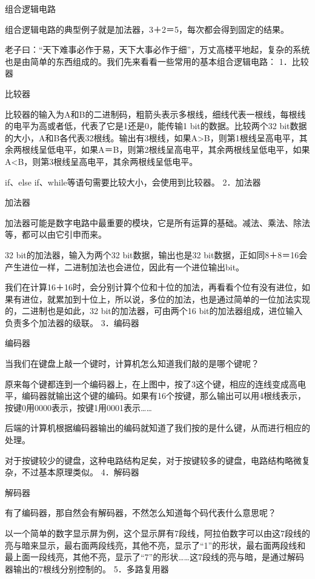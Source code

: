 \documentclass[12pt,UTF8]{ctexbook}
\begin{document}
组合逻辑电路

组合逻辑电路的典型例子就是加法器，3＋2＝5，每次都会得到固定的结果。

老子曰：“天下难事必作于易，天下大事必作于细”，万丈高楼平地起，复杂的系统也是由简单的东西组成的。我们先来看看一些常用的基本组合逻辑电路：
1．比较器

比较器

比较器的输入为A和B的二进制码，粗箭头表示多根线，细线代表一根线，每根线的电平为高或者低，代表了它是1还是0，能传输1 bit的数据。比较两个32 bit数据的大小，A和B各代表32根线。输出有3根线，如果A>B，则第1根线呈高电平，其余两根线呈低电平，如果A＝B，则第2根线呈高电平，其余两根线呈低电平，如果A<B，则第3根线呈高电平，其余两根线呈低电平。

if、else if、while等语句需要比较大小，会使用到比较器。
2．加法器

加法器

加法器可能是数字电路中最重要的模块，它是所有运算的基础。减法、乘法、除法等，都可以由它引申而来。

32 bit的加法器，输入为两个32 bit数据，输出也是32 bit数据，正如同8＋8＝16会产生进位一样，二进制加法也会进位，因此有一个进位输出bit。

我们在计算16＋16时，会分别计算个位和十位的加法，再看看个位有没有进位，如果有进位，就累加到十位上，所以说，多位的加法，也是通过简单的一位加法实现的，二进制也是如此，32 bit的加法器，可由两个16 bit的加法器组成，进位输入负责多个加法器的级联。
3．编码器

编码器

当我们在键盘上敲一个键时，计算机怎么知道我们敲的是哪个键呢？

原来每个键都连到一个编码器上，在上图中，按了3这个键，相应的连线变成高电平，编码器就输出这个键的编码。如果有16个按键，那么输出可以用4根线表示，按键0用0000表示，按键1用0001表示……

后端的计算机根据编码器输出的编码就知道了我们按的是什么键，从而进行相应的处理。

对于按键较少的键盘，这种电路结构足矣，对于按键较多的键盘，电路结构略微复杂，不过基本原理类似。
4．解码器

解码器

有了编码器，那自然会有解码器，不然怎么知道每个码代表什么意思呢？

以一个简单的数字显示屏为例，这个显示屏有7段线，阿拉伯数字可以由这7段线的亮与暗来显示，最右面两段线亮，其他不亮，显示了“1”的形状，最右面两段线和最上面一段线亮，其他不亮，显示了“7”的形状……这7段线的亮与暗，是通过解码器输出的7根线分别控制的。
5．多路复用器
\end{document}
